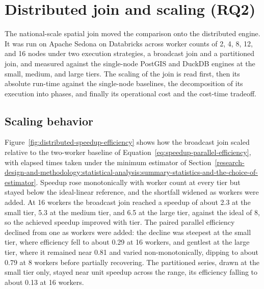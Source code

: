 \section{Distributed join and scaling (RQ2)}
\label{results:distributed-join-and-scaling}

The national-scale spatial join moved the comparison onto the distributed engine. It was run on Apache Sedona on Databricks across worker counts of \num{2}, \num{4}, \num{8}, \num{12}, and \num{16} nodes under two execution strategies, a broadcast join and a partitioned join, and measured against the single-node PostGIS and DuckDB engines at the small, medium, and large tiers. The scaling of the join is read first, then its absolute run-time against the single-node baselines, the decomposition of its execution into phases, and finally its operational cost and the cost-time tradeoff.

\subsection{Scaling behavior}
\label{results:distributed-join-and-scaling:scaling-behavior}

Figure~\ref{fig:distributed-speedup-efficiency} shows how the broadcast join scaled relative to the two-worker baseline of Equation~\ref{eq:speedup-parallel-efficiency}, with elapsed times taken under the minimum estimator of Section~\ref{research-design-and-methodology:statistical-analysis:summary-statistics-and-the-choice-of-estimator}. Speedup rose monotonically with worker count at every tier but stayed below the ideal-linear reference, and the shortfall widened as workers were added. At \num{16} workers the broadcast join reached a speedup of about \num{2.3} at the small tier, \num{5.3} at the medium tier, and \num{6.5} at the large tier, against the ideal of \num{8}, so the achieved speedup improved with tier. The paired parallel efficiency declined from one as workers were added: the decline was steepest at the small tier, where efficiency fell to about \num{0.29} at \num{16} workers, and gentlest at the large tier, where it remained near \num{0.81} and varied non-monotonically, dipping to about \num{0.79} at \num{8} workers before partially recovering. The partitioned series, drawn at the small tier only, stayed near unit speedup across the range, its efficiency falling to about \num{0.13} at \num{16} workers.

